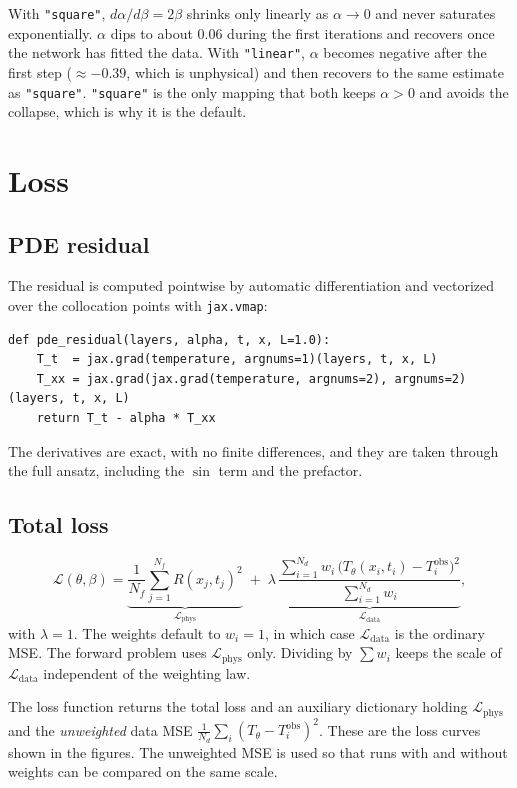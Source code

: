 \documentclass[10pt]{article}
\newcommand{\code}[1]{\texttt{#1}}
\begin{document}
With \code{"square"}, $d\alpha/d\beta=2\beta$ shrinks only linearly as $\alpha\to0$ and never saturates exponentially. $\alpha$ dips to about $0.06$ during the first iterations and recovers once the network has fitted the data. With \code{"linear"}, $\alpha$ becomes negative after the first step ($\approx-0.39$, which is unphysical) and then recovers to the same estimate as \code{"square"}. \code{"square"} is the only mapping that both keeps $\alpha>0$ and avoids the collapse, which is why it is the default.

\section{Loss}

\subsection{PDE residual}
The residual is computed pointwise by automatic differentiation and vectorized over the collocation points with \code{jax.vmap}:
\begin{lstlisting}
def pde_residual(layers, alpha, t, x, L=1.0):
    T_t  = jax.grad(temperature, argnums=1)(layers, t, x, L)
    T_xx = jax.grad(jax.grad(temperature, argnums=2), argnums=2)(layers, t, x, L)
    return T_t - alpha * T_xx
\end{lstlisting}
The derivatives are exact, with no finite differences, and they are taken through the full ansatz, including the $\sin$ term and the prefactor.

\subsection{Total loss}
\begin{equation}
\mathcal{L}(\theta,\beta)=\underbrace{\frac{1}{N_f}\sum_{j=1}^{N_f}R(x_j,t_j)^2}_{\mathcal{L}_{\text{phys}}}
\;+\;\lambda\,\underbrace{\frac{\sum_{i=1}^{N_d}w_i\,\big(T_\theta(x_i,t_i)-T_i^{\text{obs}}\big)^2}{\sum_{i=1}^{N_d}w_i}}_{\mathcal{L}_{\text{data}}} ,
\end{equation}
with $\lambda=1$. The weights default to $w_i=1$, in which case $\mathcal{L}_{\text{data}}$ is the ordinary MSE. The forward problem uses $\mathcal{L}_{\text{phys}}$ only. Dividing by $\sum w_i$ keeps the scale of $\mathcal{L}_{\text{data}}$ independent of the weighting law.

The loss function returns the total loss and an auxiliary dictionary holding $\mathcal{L}_{\text{phys}}$ and the \emph{unweighted} data MSE $\frac1{N_d}\sum_i(T_\theta-T_i^{\text{obs}})^2$. These are the loss curves shown in the figures. The unweighted MSE is used so that runs with and without weights can be compared on the same scale.
\end{document}
